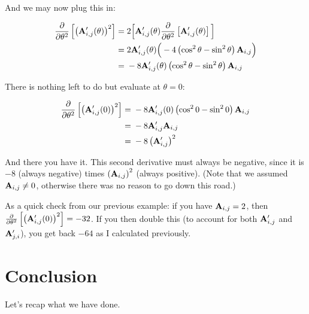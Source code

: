 \documentclass[11pt, oneside]{amsart}
\begin{document}
And we may now plug this in:

\begin{equation*}
  \begin{split}
      \frac{\partial }{\partial \theta^2} \left[ \left( \mathbf{A}'_{i, j}(\theta) \right)^2 \right]
    ={}&
      2 \Big[
        \mathbf{A}'_{i, j}(\theta)
        \frac{\partial }{\partial \theta^2} \left[ \mathbf{A}'_{i, j}(\theta) \right]
      \Big] \\
    ={}&
      2 \mathbf{A}'_{i, j}(\theta) \Big(
        -4 \left( \cos^2\theta - \sin^2\theta \right) \mathbf{A}_{i, j}
      \Big) \\
    ={}&
      -8 \mathbf{A}'_{i, j}(\theta)
      \left( \cos^2\theta - \sin^2\theta \right) \mathbf{A}_{i, j} \\
  \end{split}
\end{equation*}

There is nothing left to do but evaluate at $\theta = 0$:

\begin{equation*}
  \begin{split}
      \frac{\partial }{\partial \theta^2} \left[ \left( \mathbf{A}'_{i, j}(0) \right)^2 \right]
    ={}&
      -8 \mathbf{A}'_{i, j}(0)
      \left( \cos^2 0 - \sin^2 0 \right) \mathbf{A}_{i, j} \\
    ={}&
      -8 \mathbf{A}'_{i, j} \mathbf{A}_{i, j} \\
    ={}&
      -8 \left( \mathbf{A}'_{i, j} \right)^2 \\
  \end{split}
\end{equation*}

And there you have it. This second derivative must always be negative,
since it is $-8$ (always negative) times $\left( \mathbf{A}_{i, j} \right)^2$
(always positive). (Note that we assumed $\mathbf{A}_{i, j} \ne 0$, otherwise
there was no reason to go down this road.)

As a quick check from our previous example: if you have $\mathbf{A}_{i, j} =
2$, then $\frac{\partial }{\partial \theta^2} \left[ \left( \mathbf{A}'_{i, j}(0) \right)^2 \right] =
-32$. If you then double this (to account for both $\mathbf{A}'_{i, j}$ and
$\mathbf{A}'_{j, i}$), you get back $-64$ as I calculated previously.

\section{Conclusion}

Let's recap what we have done.
\end{document}
